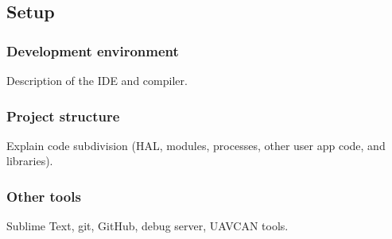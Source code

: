 \subsection{Setup}



\subsubsection{Development environment}
Description of the IDE and compiler.

\subsubsection{Project structure}
Explain code subdivision (HAL, modules, processes, other user app code, and libraries).

\subsubsection{Other tools}
Sublime Text, git, GitHub, debug server, UAVCAN tools.
